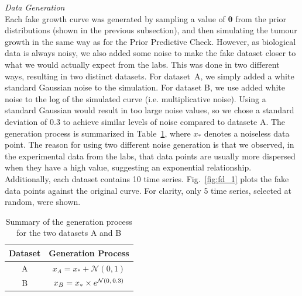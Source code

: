 \documentclass[11pt]{article}
\begin{document}
\textit{Data Generation}\\[5pt]
Each fake growth curve was generated by sampling a value of $\boldsymbol{\theta}$ from the prior distributions (shown in the previous subsection), and then simulating the tumour growth in the same way as for the Prior Predictive Check. However, as biological data is always noisy, we also added some noise to make the fake dataset closer to what we would actually expect from the labs. This was done in two different ways, resulting in two distinct datasets. For dataset~A, we simply added a white standard Gaussian noise to the simulation. For dataset B, we use added white noise to the log of the simulated curve (i.e. multiplicative noise). Using a standard Gaussian would result in too large noise values, so we chose a standard deviation of 0.3 to achieve similar levels of noise compared to datasete A. The generation process is summarized in Table~\ref{tbl:genproc}, where $x_*$ denotes a noiseless data point. The reason for using two different noise generation is that we observed, in the experimental data from the labs, that data points are usually more dispersed when they have a high value, suggesting an exponential relationship.\\ 
Additionally, each dataset contains 10 time series. Fig.~\ref{fig:fd_1} plots the fake data points against the original curve. For clarity, only 5 time series, selected at random, were shown.\\
\begin{table}[h!]
    \centering
    \caption{Summary of the generation process for the two datasets A and B}
    \begin{tabular}{c|c}
        \hline
        Dataset & Generation Process \\ \hline 
        A       & $x_A=x_*+\mathcal{N}(0,1)$ \\
        B       & $x_B=x_*\times e^{\mathcal{N}(0,\hspace{1.5px}0.3)}$ \\ \hline
    \end{tabular}
    \label{tbl:genproc}
\end{table}
\end{document}
